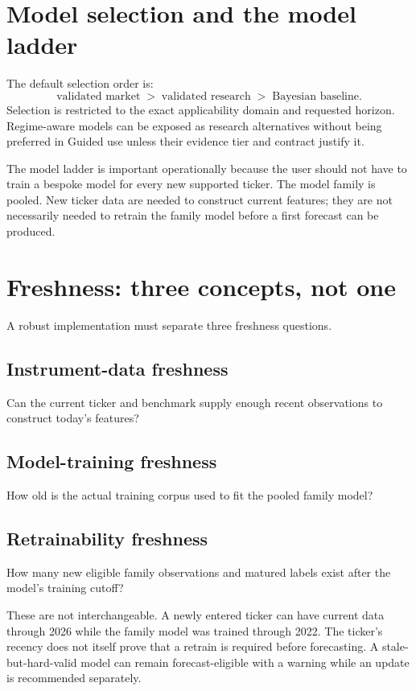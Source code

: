 \documentclass[11pt]{article}
\begin{document}
\section{Model selection and the model ladder}
The default selection order is:
\begin{equation}
\text{validated market}\;>\;\text{validated research}\;>\;\text{Bayesian baseline}.
\end{equation}
Selection is restricted to the exact applicability domain and requested horizon. Regime-aware models can be exposed as research alternatives without being preferred in Guided use unless their evidence tier and contract justify it.

The model ladder is important operationally because the user should not have to train a bespoke model for every new supported ticker. The model family is pooled. New ticker data are needed to construct current features; they are not necessarily needed to retrain the family model before a first forecast can be produced.

\section{Freshness: three concepts, not one}
A robust implementation must separate three freshness questions.

\subsection{Instrument-data freshness}
Can the current ticker and benchmark supply enough recent observations to construct today's features?

\subsection{Model-training freshness}
How old is the actual training corpus used to fit the pooled family model?

\subsection{Retrainability freshness}
How many new eligible family observations and matured labels exist after the model's training cutoff?

These are not interchangeable. A newly entered ticker can have current data through 2026 while the family model was trained through 2022. The ticker's recency does not itself prove that a retrain is required before forecasting. A stale-but-hard-valid model can remain forecast-eligible with a warning while an update is recommended separately.
\end{document}
